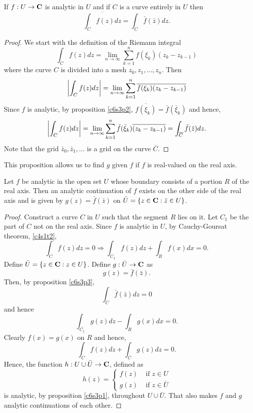 \begin{prop}\label{c6s3p3}
If $f: U \rightarrow \mathbf{C}$ is analytic in $U$ and if $C$ is a curve entirely in $U$ then
\[
\overline{\int_C f(z)dz } = \int_{\overline{C}}\bar{f}(\bar{z})dz.
\]
\end{prop}
\begin{proof}
We start with the definition of the Riemann integral
\[
\int_C f(z)dz = \lim_{n \rightarrow \infty}\sum_{k=1}^n f(\xi_k)(z_k - z_{k-1})
\]
where the curve $C$ is divided into a mesh $z_0, z_1, \ldots, z_n$. Then
\[
\left\vert{\int_C f(z)dz}\right\vert =  \lim_{n \rightarrow \infty}\sum_{k=1}^n \overline{f(\xi_k)}
\overline{(z_k - z_{k-1})}
\]
Since $f$ is analytic, by proposition \ref{c6s3p2}, $\overline{f(\xi_k)} = \bar{f}
(\bar{\xi}_k)$ and hence,
\[
\left\vert{\int_C f(z)dz}\right\vert =  \lim_{n \rightarrow \infty}\sum_{k=1}^n \bar{f}(\bar{\xi}_k)
\overline{(z_k - z_{k-1})} = \int_{\overline{C}} \bar{f}(\bar{z})dz.
\]
Note that the grid $\bar{z}_0, \bar{z}_1, \ldots$ is a grid on the curve $\overline{C}$.
\end{proof}

This proposition allows us to find $g$ given $f$ if $f$ is real-valued on the real axis.
\begin{thm}\label{c6s3t1}
Let $f$ be analytic in the open set $U$ whose boundary consists of a portion $R$ of the
real axis. Then an analytic continuation of $f$ exists on the other side of the real axis
and is given by $g(z) = \bar{f}(\bar{z})$ on $\bar{U} = \{z \in \mathbf{C}: \bar{z} \in U\}$.
\end{thm}
\begin{proof}
Construct a curve $C$ in $U$ such that the segment $R$ lies on it. Let $C_1$ be the part
of $C$ not on the real axis. Since $f$ is analytic in $U$, by Cauchy-Goursat theorem,
\ref{c4s1t2},
\[
\int_C f(z)dz = 0 \Rightarrow \int_{C_1} f(z)dz + \int_R f(x)dx = 0.
\]
Define $\bar{U} = \{z \in \mathbf{C}: z \in U\}$. Define $g: \bar{U} \rightarrow \mathbf{C}$ as
\[
g(z) = \bar{f}(\bar{z}).
\]
Then, by proposition \ref{c6s3p3},
\[
\int_{\overline{C}}\bar{f}(\bar{z})dz = 0
\]
and hence
\[
\int_{\bar{C_1}}g(z)dz - \int_R g(x)dx = 0.
\]
Clearly $f(x) = g(x)$ on $R$ and hence,
\[
\int_C f(z)dz + \int_{\overline{C}} g(z)dz = 0.
\]
Hence, the function $h : U \cup \bar{U} \rightarrow \mathbf{C}$, defined as
\[
h(z) = \begin{cases}
f(z) & \text{ if } z \in U \\
g(z) & \text{ if } z \in \bar{U}
\end{cases}
\]
is analytic, by proposition \ref{c6s3p1}, throughout $U \cup \bar{U}$. That 
also makes $f$ and $g$ analytic continuations of each other.
\end{proof}

